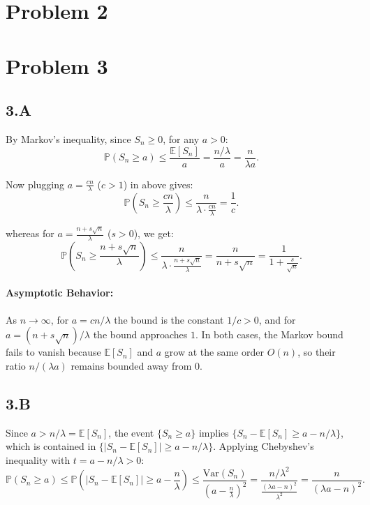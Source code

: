 \documentclass{article}
\begin{document}
\section*{Problem 2}
\section*{Problem 3}
\subsection*{3.A}

By Markov's inequality, since $S_n \ge 0$, for any $a > 0$:
\[
\mathbb{P}(S_n \ge a) \le \frac{\mathbb{E}[S_n]}{a} = \frac{n/\lambda}{a} = \frac{n}{\lambda a}.
\]

Now plugging $a = \frac{cn}{\lambda}$ ($c > 1$) in above gives: 
\[
\mathbb{P} \left(S_n \ge \frac{cn}{\lambda}\right) \le \frac{n}{\lambda \cdot \frac{cn}{\lambda}} = \frac{1}{c}.
\]

whereas for $a = \frac{n + s\sqrt{n}}{\lambda}$ ($s > 0$), we get:
\[
\mathbb{P} \left(S_n \ge \frac{n + s\sqrt{n}}{\lambda}\right) \le \frac{n}{\lambda \cdot \frac{n + s\sqrt{n}}{\lambda}} = \frac{n}{n + s\sqrt{n}} = \frac{1}{1 + \frac{s}{\sqrt{n}}}.
\]

\paragraph{Asymptotic Behavior:}
As $n \to \infty$, for $a = cn/\lambda$ the bound is the constant $1/c > 0$, and for $a = (n + s\sqrt{n})/\lambda$ the bound approaches $1$. In both cases, the Markov bound fails to vanish because $\mathbb{E}[S_n]$ and $a$ grow at the same order $O(n)$, so their ratio $n/(\lambda a)$ remains bounded away from $0$.

\subsection*{3.B}

Since $a > n/\lambda = \mathbb{E}[S_n]$, the event $\{S_n \ge a\}$ implies $\{S_n - \mathbb{E}[S_n] \ge a - n/\lambda\}$, which is contained in $\{|S_n - \mathbb{E}[S_n]| \ge a - n/\lambda\}$. Applying Chebyshev's inequality with $t = a - n/\lambda > 0$:
\[
\mathbb{P}(S_n \ge a) \le \mathbb{P}\left(|S_n - \mathbb{E}[S_n]| \ge a - \frac{n}{\lambda}\right) \le \frac{\text{Var}(S_n)}{\left(a - \frac{n}{\lambda}\right)^2} = \frac{n/\lambda^2}{\frac{(\lambda a - n)^2}{\lambda^2}} = \frac{n}{(\lambda a - n)^2}.
\]
\end{document}
